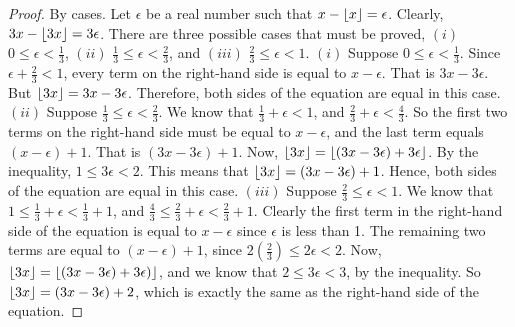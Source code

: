 \documentclass[a4paper, 12pt]{article}
\theoremstyle{plain}
\DeclarePairedDelimiter{\floor}{\lfloor}{\rfloor}
\begin{document}
\begin{proof}
    By cases. Let $\epsilon$ be a real number such that $x - \floor{x} = \epsilon$. Clearly, 
    $3x - \floor{3x} = 3\epsilon$. There are three possible cases that must be proved, 
    \newline $(i)$ $0 \le \epsilon < \frac{1}{3}$, $(ii)$ 
    $\frac{1}{3} \le \epsilon < \frac{2}{3}$, and $(iii)$ $\frac{2}{3} \le \epsilon < 1$.
    \newline
    \newline
    $(i)$ Suppose $0 \le \epsilon < \frac{1}{3}$. Since $\epsilon + \frac{2}{3} < 1$, every 
    term on the right-hand side is equal to $x - \epsilon$. That is $3x - 3\epsilon$. But 
    $\floor{3x} = 3x - 3\epsilon$. Therefore, both sides of the equation are equal in this case.
    \newline
    \newline
    $(ii)$ Suppose $\frac{1}{3} \le \epsilon < \frac{2}{3}$. We know that 
    $\frac{1}{3} + \epsilon < 1$, and $\frac{2}{3} + \epsilon < \frac{4}{3}$. So the first two 
    terms on the right-hand side must be equal to $x - \epsilon$, and the last term equals 
    $(x - \epsilon) + 1$. That is $(3x - 3\epsilon) + 1$. Now, 
    $\floor{3x} = \floor{(3x - 3\epsilon) + 3\epsilon}$. By the inequality, 
    $1 \le 3\epsilon < 2$. This means that $\floor{3x} = (3x - 3\epsilon) + 1$. Hence, both 
    sides of the equation are equal in this case.
    \newline
    \newline
    $(iii)$ Suppose $\frac{2}{3} \le \epsilon < 1$. We know that 
    $1 \le \frac{1}{3} + \epsilon < \frac{1}{3} + 1$, and \newline 
    $\frac{4}{3} \le \frac{2}{3} + \epsilon < \frac{2}{3} + 1$. Clearly the first term in the 
    right-hand side of the equation is equal to $x - \epsilon$ since $\epsilon$ is less than 
    1. The remaining two terms are equal to $(x - \epsilon) + 1$, since 
    $2(\frac{2}{3}) \le 2\epsilon < 2$. Now, 
    $\floor{3x} = \floor{(3x - 3\epsilon) + 3\epsilon)}$, and we know that 
    $2 \le 3\epsilon < 3$, by the inequality. So $\floor{3x} = (3x - 3\epsilon) + 2$, which is 
    exactly the same as the right-hand side of the equation.
\end{proof}
\end{document}
